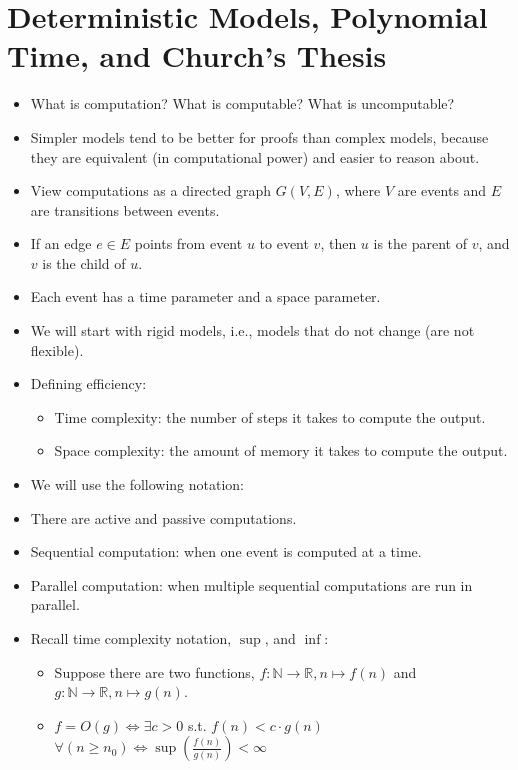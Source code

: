 \documentclass[11pt]{article}
\begin{document}
\section{Deterministic Models, Polynomial Time, and Church's Thesis}
\begin{itemize}
    \item What is computation? What is computable? What is uncomputable?
    \item Simpler models tend to be better for proofs than complex models, because they are equivalent (in computational power) and easier to reason about.
    \item View computations as a directed graph \(G(V,E)\), where \(V\) are events and \(E\) are transitions between events.
    \item If an edge \(e \in E\) points from event \(u\) to event \(v\), then \(u\) is the parent of \(v\), and \(v\) is the child of \(u\).
    \item Each event has a time parameter and a space parameter.
    \item We will start with rigid models, i.e., models that do not change (are not flexible).
    \item Defining efficiency:
    \begin{itemize}
        \item Time complexity: the number of steps it takes to compute the output.
        \item Space complexity: the amount of memory it takes to compute the output.
    \end{itemize}
    \item We will use the following notation: %
    \item There are active and passive computations.
    \item Sequential computation: when one event is computed at a time.
    \item Parallel computation: when multiple sequential computations are run in parallel.
    \item Recall time complexity notation, \(\sup\), and \(\inf\):
    \begin{itemize}
        \item Suppose there are two functions, \(f:\mathbb{N} \rightarrow \mathbb{R}, n \mapsto f(n)\) and \(g:\mathbb{N} \rightarrow \mathbb{R}, n \mapsto g(n)\).
        \item \(f = O(g) \iff \exists c > 0\) s.t. \(f(n) < c \cdot g(n)\) \(\forall (n \geq n_0) \iff \sup(\frac{f(n)}{g(n)}) < \infty\)

\end{itemize}
\end{itemize}
\end{document}
